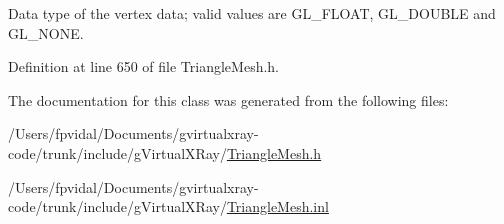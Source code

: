 Data type of the vertex data; valid values are GL\_\-FLOAT, GL\_\-DOUBLE and GL\_\-NONE. 



Definition at line 650 of file TriangleMesh.h.



The documentation for this class was generated from the following files:\begin{DoxyCompactItemize}
\item 
/Users/fpvidal/Documents/gvirtualxray-\/code/trunk/include/gVirtualXRay/\hyperlink{_triangle_mesh_8h}{TriangleMesh.h}\item 
/Users/fpvidal/Documents/gvirtualxray-\/code/trunk/include/gVirtualXRay/\hyperlink{_triangle_mesh_8inl}{TriangleMesh.inl}\end{DoxyCompactItemize}
